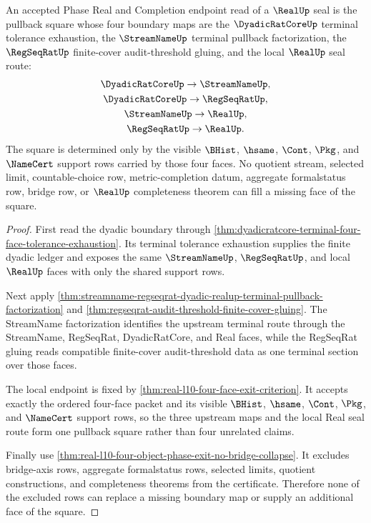 \begin{theorem}
\label{thm:real-l10-terminal-route-pullback-square}
An accepted Phase Real and Completion endpoint read of a $\RealUp$ seal is the pullback square whose four boundary maps are the $\DyadicRatCoreUp$ terminal tolerance exhaustion, the $\StreamNameUp$ terminal pullback factorization, the $\RegSeqRatUp$ finite-cover audit-threshold gluing, and the local $\RealUp$ seal route:
$$
\begin{gathered}
\DyadicRatCoreUp \to \StreamNameUp,\\
\DyadicRatCoreUp \to \RegSeqRatUp,\\
\StreamNameUp \to \RealUp,\\
\RegSeqRatUp \to \RealUp.
\end{gathered}
$$
The square is determined only by the visible $\BHist$, $\hsame$, $\Cont$, $\Pkg$, and $\NameCert$ support rows carried by those four faces. No quotient stream, selected limit, countable-choice row, metric-completion datum, aggregate formalstatus row, bridge row, or $\RealUp$ completeness theorem can fill a missing face of the square.
\end{theorem}
\begin{proof}
First read the dyadic boundary through \autoref{thm:dyadicratcore-terminal-four-face-tolerance-exhaustion}. Its terminal tolerance exhaustion supplies the finite dyadic ledger and exposes the same $\StreamNameUp$, $\RegSeqRatUp$, and local $\RealUp$ faces with only the shared support rows.

Next apply \autoref{thm:streamname-regseqrat-dyadic-realup-terminal-pullback-factorization} and \autoref{thm:regseqrat-audit-threshold-finite-cover-gluing}. The StreamName factorization identifies the upstream terminal route through the StreamName, RegSeqRat, DyadicRatCore, and Real faces, while the RegSeqRat gluing reads compatible finite-cover audit-threshold data as one terminal section over those faces.

The local endpoint is fixed by \autoref{thm:real-l10-four-face-exit-criterion}. It accepts exactly the ordered four-face packet and its visible $\BHist$, $\hsame$, $\Cont$, $\Pkg$, and $\NameCert$ support rows, so the three upstream maps and the local Real seal route form one pullback square rather than four unrelated claims.

Finally use \autoref{thm:real-l10-four-object-phase-exit-no-bridge-collapse}. It excludes bridge-axis rows, aggregate formalstatus rows, selected limits, quotient constructions, and completeness theorems from the certificate. Therefore none of the excluded rows can replace a missing boundary map or supply an additional face of the square.
\end{proof}

